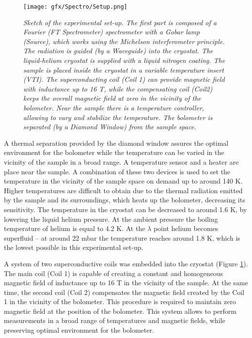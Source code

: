 \documentclass[titlepage,a4paper]{book}
\begin{document}
\begin{figure}[ht]
	\centering
	\texttt{[image: gfx/Spectro/Setup.png]}
	\vspace{-10pt}
	\caption{\textit{Sketch of the experimental set-up. The first part is composed of a Fourier (FT Spectrometer) spectrometer with a Gobar lamp (Source), which works using the Michelson interferometer principle. The radiation is guided (by a Waveguide) into the cryostat. The liquid-helium cryostat is supplied with a liquid nitrogen coating. The sample is placed inside the cryostat in a variable temperature insert (VTI). The superconducting coil (Coil 1) can provide magnetic field with inductance up to 16 T, while the compensating coil (Coil2) keeps the overall magnetic field at zero in the vicinity of the bolometer. Near the sample there is a temperature controller, allowing to vary and stabilize the temperature. The bolometer is separated (by a Diamond Window) from the sample space.}}
	\label{fig:Experimental_setup}
\end{figure}

A thermal separation provided by the diamond window assures the optimal environment for the bolometer while the temperature can be varied in the vicinity of the sample in a broad range. A temperature sensor and a heater are place near the sample. A combination of these two devices is used to set the temperature in the vicinity of the sample space on demand up to around 140 K. Higher temperatures are difficult to obtain due to the thermal radiation emitted by the sample and its surroundings, which heats up the bolometer, decreasing its sensitivity. The temperature in the cryostat can be decreased to around 1.6 K, by lowering the liquid helium pressure. At the ambient pressure the boiling temperature of helium is equal to 4.2 K. At the $\lambda$ point helium becomes superfluid -- at around 22 mbar the temperature reaches around 1.8 K, which is the lowest possible in this experimental set-up.

A system of two superconductive coils was embedded into the cryostat (Figure \ref{fig:Experimental_setup}). The main coil (Coil 1) is capable of creating a constant and homogeneous magnetic field of inductance up to 16 T in the vicinity of the sample. At the same time, the second coil (Coil 2) compensates the magnetic field created by the Coil 1 in the vicinity of the bolometer. This procedure is required to maintain zero magnetic field at the position of the bolometer. This system allows to perform measurements in a broad range of temperatures and magnetic fields, while preserving optimal environment for the bolometer.
\end{document}

